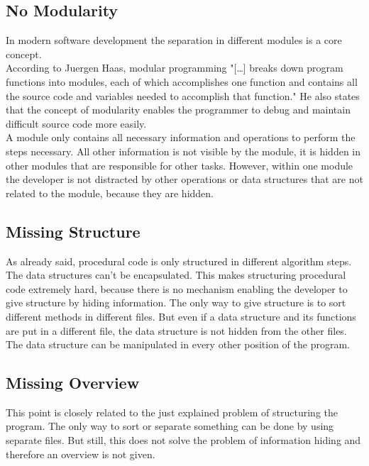 \subsection*{No Modularity}
\label{problem:nomodularity}
In modern software development the separation in different modules is a core concept.\\

According to Juergen Haas, modular programming "[\dots{}] breaks down program functions into modules, each of which accomplishes one function and contains all the source code and variables needed to accomplish that function." \cite{about} He also states that the concept of modularity enables the programmer to debug and maintain difficult source code more easily. \\

A module only contains all necessary information and operations to perform the steps necessary. All other information is not visible by the module, it is hidden in other modules that are responsible for other tasks. However, within one module the developer is not distracted by other operations or data structures that are not related to the module, because they are hidden. 

\subsection*{Missing Structure}
As already said, procedural code is only structured in different algorithm steps. The data structures can't be encapsulated. This makes structuring procedural code extremely hard, because there is no mechanism enabling the developer to give structure by hiding information. The only way to give structure is to sort different methods in different files. But even if a data structure and its functions are put in a different file, the data structure is not hidden from the other files. The data structure can be manipulated in every other position of the program.

\subsection*{Missing Overview}
This point is closely related to the just explained problem of structuring the program. The only way to sort or separate something can be done by using separate files. But still, this does not solve the problem of information hiding and therefore an overview is not given.

